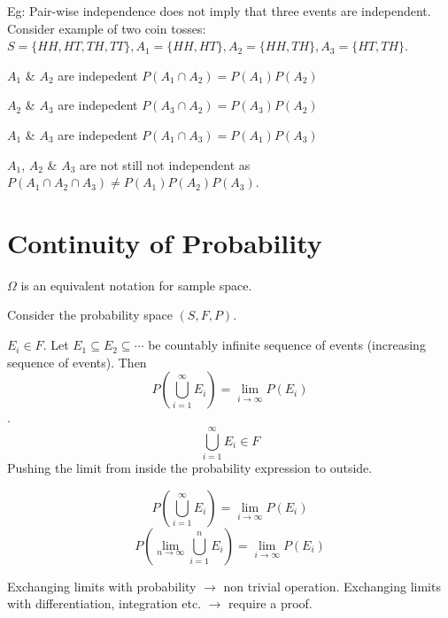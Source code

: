 \documentclass{article}
\begin{document}
Eg: Pair-wise independence does not imply that three events are independent.
Consider example of two coin tosses:
$S= \{HH,HT,TH,TT\}, A_1=\{HH,HT\},A_2=\{HH,TH\},A_3=\{HT,TH\}$.

$A_1$ \& $A_2$ are indepedent $P(A_1 \cap A_2)=P(A_1)P(A_2)$

$A_2$ \& $A_3$ are indepedent $P(A_3 \cap A_2)=P(A_3)P(A_2)$

$A_1$ \& $A_3$ are indepedent $P(A_1 \cap A_3)=P(A_1)P(A_3)$

$A_1$, $A_2$  \& $A_3$ are not still not independent as $P(A_1 \cap A_2 \cap A_3) \neq P(A_1)P(A_2)P(A_3)$.

\section{Continuity of Probability}
$\Omega$ is an equivalent notation for sample space.

Consider the probability space $(S,F,P)$.

$E_i \in F$. Let $E_1 \subseteq E_2 \subseteq \cdots$ be countably infinite sequence of events (increasing sequence of events).
Then $$P(\bigcup_{i=1}^{\infty} E_i)= \lim_{i \to \infty} P(E_i)$$.
$$ \bigcup_{i=1}^{\infty} E_i \in F$$
Pushing the limit from inside the probability expression to outside.

$$P(\bigcup_{i=1}^{\infty} E_i)=\lim_{i \to \infty }P(E_i)$$
$$P(\lim_{n \to \infty} \bigcup_{i=1}^{n}E_i)=\lim_{i \to \infty }P(E_i)$$

Exchanging limits with probability $\rightarrow$ non trivial operation.
Exchanging limits with differentiation, integration etc. $\rightarrow$ require a proof.
\end{document}
